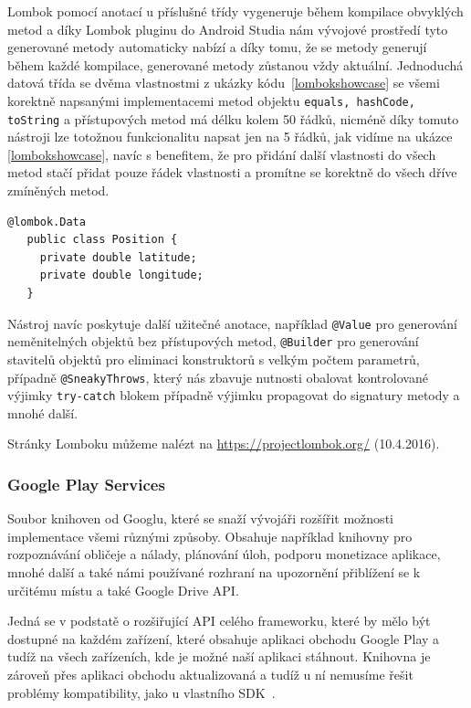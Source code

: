 \documentclass[czech,master,public,dept460,male,java,cpdeclaration]{diploma}
\begin{document}
Lombok pomocí anotací u příslušné třídy vygeneruje během kompilace obvyklých metod a díky Lombok
pluginu do Android Studia nám vývojové prostředí tyto generované metody automaticky nabízí a díky tomu,
že se metody generují během každé kompilace, generované metody zůstanou vždy aktuální. Jednoduchá datová
třída se dvěma vlastnostmi z ukázky kódu~\ref{lombokshowcase} se všemi korektně napsanými implementacemi
metod objektu \texttt{equals, hashCode, toString} a přístupových metod má délku kolem 50 řádků, nicméně
díky tomuto nástroji lze totožnou funkcionalitu napsat jen na 5 řádků, jak vidíme na ukázce \ref{lombokshowcase},
navíc s benefitem, že pro přidání další vlastnosti do všech metod stačí přidat pouze řádek vlastnosti
a promítne se korektně do všech dříve zmíněných metod.

\begin{lstlisting}[label=lombokshowcase,caption=Datová třída používající Lombok]
   @lombok.Data
   public class Position {
     private double latitude;
     private double longitude;
   }
\end{lstlisting}

Nástroj navíc poskytuje další užitečné anotace, například \texttt{@Value} pro generování neměnitelných objektů
bez přístupových metod, \texttt{@Builder} pro generování stavitelů objektů pro eliminaci konstruktorů s velkým
počtem parametrů, případně \texttt{@SneakyThrows}, který nás zbavuje nutnosti obalovat kontrolované výjimky
\texttt{try-catch} blokem případně výjimku propagovat do signatury metody a mnohé další.

Stránky Lomboku můžeme nalézt na \url{https://projectlombok.org/} (10.4.2016).

\subsubsection{Google Play Services}
Soubor knihoven od Googlu, které se snaží vývojáři rozšířit možnosti implementace všemi různými způsoby.
Obsahuje například knihovny pro rozpoznávání obličeje a nálady, plánování úloh, podporu monetizace aplikace,
mnohé další a také námi používané rozhraní na upozornění přiblížení se k určitému místu a také Google Drive API.

Jedná se v podstatě o rozšiřující API celého frameworku, které by mělo být dostupné na každém zařízení, které
obsahuje aplikaci obchodu Google Play a tudíž na všech zařízeních, kde je možné naší aplikaci stáhnout.
Knihovna je zároveň přes aplikaci obchodu aktualizovaná a tudíž u ní nemusíme řešit problémy
kompatibility, jako u vlastního SDK~\cite{gms}.
\end{document}
